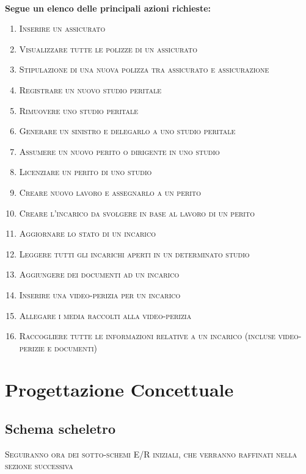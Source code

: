 \documentclass[a4paper,12pt]{report}
\begin{document}
\\
\textbf{Segue un elenco delle principali azioni richieste:}
\begin{enumerate}
    \item \textsc{Inserire un assicurato}
    \item \textsc{Visualizzare tutte le polizze di un assicurato}
    \item \textsc{Stipulazione di una nuova polizza tra assicurato e assicurazione}
    \item \textsc{Registrare un nuovo studio peritale}
    \item \textsc{Rimuovere uno studio peritale}
    \item \textsc{Generare un sinistro e delegarlo a uno studio peritale}
    \item \textsc{Assumere un nuovo perito o dirigente in uno studio}
    \item \textsc{Licenziare un perito di uno studio}
    \item \textsc{Creare nuovo lavoro e assegnarlo a un perito}
    \item \textsc{Creare l’incarico da svolgere in base al lavoro di un perito}
    \item \textsc{Aggiornare lo stato di un incarico}
    \item \textsc{Leggere tutti gli incarichi aperti in un determinato studio}
    \item \textsc{Aggiungere dei documenti ad un incarico}
    \item \textsc{Inserire una video-perizia per un incarico}
    \item \textsc{Allegare i media raccolti alla video-perizia}
    \item \textsc{Raccogliere tutte le informazioni relative a un incarico (incluse video-perizie e documenti)}
\end{enumerate}


\chapter{Progettazione Concettuale}

\section{Schema scheletro}

\textsc{Seguiranno ora dei sotto-schemi E/R iniziali, che verranno raffinati nella sezione successiva}
\end{document}
